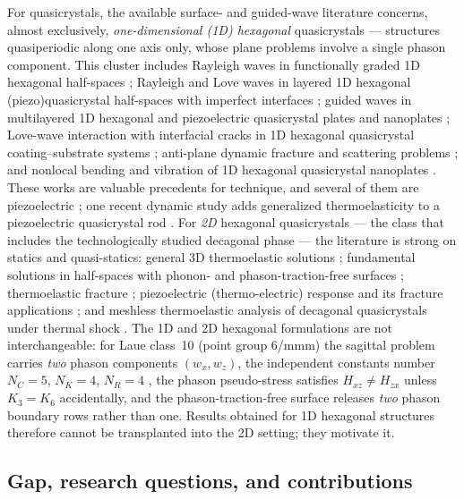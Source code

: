 \documentclass[11pt]{article}
\begin{document}
For quasicrystals, the available surface- and guided-wave literature concerns, almost exclusively, \emph{one-dimensional (1D) hexagonal} quasicrystals --- structures quasiperiodic along one axis only, whose plane problems involve a single phason component. This cluster includes Rayleigh waves in functionally graded 1D hexagonal half-spaces \cite{zhang2023cryst}; Rayleigh and Love waves in layered 1D hexagonal (piezo)quasicrystal half-spaces with imperfect interfaces \cite{zhang2024amm,zhang2025zamm}; guided waves in multilayered 1D hexagonal and piezoelectric quasicrystal plates and nanoplates \cite{zhang2021amss,zhang2021acta,feng2024amm}; Love-wave interaction with interfacial cracks in 1D hexagonal quasicrystal coating--substrate systems \cite{ma2023zamp}; anti-plane dynamic fracture and scattering problems \cite{yang2022zamm,shaonan2025actamech,zhou2019ejma}; and nonlocal bending and vibration of 1D hexagonal quasicrystal nanoplates \cite{wang2024sem}. These works are valuable precedents for technique, and several of them are piezoelectric \cite{zhang2025zamm,feng2024amm}; one recent dynamic study adds generalized thermoelasticity to a piezoelectric quasicrystal rod \cite{lizhou2024}. For \emph{2D} hexagonal quasicrystals --- the class that includes the technologically studied decagonal phase --- the literature is strong on statics and quasi-statics: general 3D thermoelastic solutions \cite{yang2014}; fundamental solutions in half-spaces with phonon- and phason-traction-free surfaces \cite{wang2015}; thermoelastic fracture \cite{li2017,li2024ijhmt}; piezoelectric (thermo-electric) response \cite{wang2021} and its fracture applications \cite{li2024ejma}; and meshless thermoelastic analysis of decagonal quasicrystals under thermal shock \cite{hosseini2019}. The 1D and 2D hexagonal formulations are not interchangeable: for Laue class~10 (point group 6/mmm) the sagittal problem carries \emph{two} phason components $(w_x,w_z)$, the independent constants number $N_C=5$, $N_K=4$, $N_R=4$ \cite{yang2014}, the phason pseudo-stress satisfies $H_{xz}\neq H_{zx}$ unless $K_3=K_6$ accidentally, and the phason-traction-free surface releases \emph{two} phason boundary rows rather than one. Results obtained for 1D hexagonal structures therefore cannot be transplanted into the 2D setting; they motivate it.

\subsection{Gap, research questions, and contributions}
\end{document}
